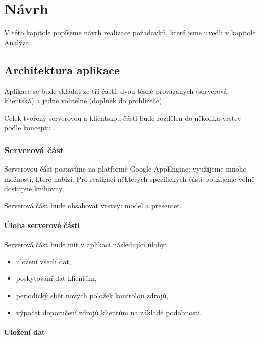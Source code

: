 \chapter{Návrh}

V této kapitole popíšeme návrh realizace požadavků, které jsme uvedli v kapitole Analýza.

\section{Architektura aplikace}

Aplikace se bude skládat ze tří částí; dvou těsně provázaných (serverová, klientská) a jedné volitelné (doplněk do prohlížeče).

Celek tvořený serverovou a klientskou části bude rozdělen do několika vrstev podle konceptu .

\subsection{Serverová část}

Serverovou část postavíme na platformě Google AppEngine; využijeme mnoho možností, které nabízí.
Pro realizaci některých specifických částí použijeme volně dostupné knihovny.

Serverová část bude obsahovat vrstvy: model a presenter.

\subsubsection{Úloha serverové části}

Serverová část bude mít v aplikaci následující úlohy:
\begin{itemize}
	\item uložení všech dat,
	\item poskytování dat klientům,
	\item periodický sběr nových položek kontrolou zdrojů,
	\item výpočet doporučení zdrojů klientům na základě podobnosti.
\end{itemize}

\subsubsection{Uložení dat}


